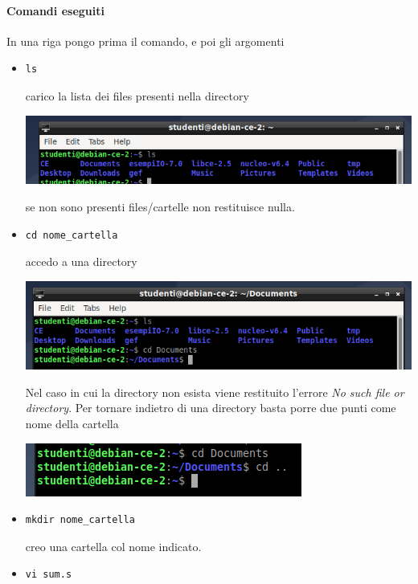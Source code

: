 \paragraph{Comandi eseguiti} In una riga pongo prima il comando, e poi gli argomenti
\begin{itemize}
	\item \begin{verbatim}ls\end{verbatim}
	carico la lista dei files presenti nella directory
	\begin{center}
		\includegraphics[scale=.8]{img/135.PNG}
	\end{center}
	se non sono presenti files/cartelle non restituisce nulla.
	\item \begin{verbatim}cd nome_cartella\end{verbatim}
	accedo a una directory
	\begin{center}
		\includegraphics[scale=.8]{img/136.PNG}
	\end{center}
	Nel caso in cui la directory non esista viene restituito l'errore \emph{No such file or directory}. Per tornare indietro di una directory basta porre due punti come nome della cartella
	\begin{center}
		\includegraphics[scale=.9]{img/137.PNG}
	\end{center}
	\item \begin{verbatim}mkdir nome_cartella\end{verbatim}
	creo una cartella col nome indicato.
	\item \begin{verbatim}vi sum.s\end{verbatim}

\end{itemize}
